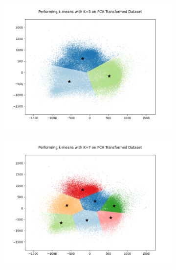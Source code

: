 \documentclass[12pt, a4paper]{article}
\begin{document}
\begin{figure}[h]
    \begin{subfigure}{0.32\linewidth}
        \includegraphics[width=\linewidth]{images/q4/c/3.png}
    \end{subfigure}
    \hfill
    \begin{subfigure}{0.32\linewidth}
        \includegraphics[width=\linewidth]{images/q4/c/7.png}
    \end{subfigure}
    \hfill
    \begin{subfigure}{0.32\linewidth}

\end{subfigure}
\end{figure}
\end{document}
